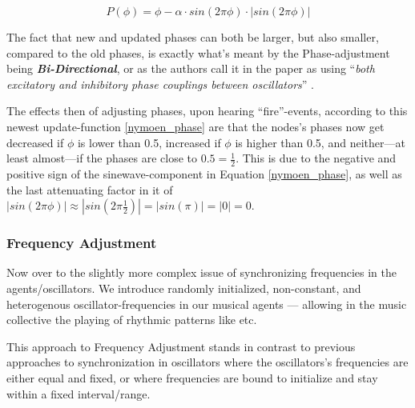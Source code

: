 			\begin{equation}
			\label{nymoen_phase}
				P(\phi) = \phi - \alpha \cdot sin(2\pi\phi) \cdot | sin(2\pi\phi) |
			\end{equation}
			
			The fact that new and updated phases can both be larger, but also smaller, compared to the old phases, is exactly what's meant by the Phase-adjustment being \textbf{\textit{Bi-Directional}}, or as the authors call it in the paper as using ``\textit{both excitatory and inhibitory phase couplings between oscillators}'' \cite{nymoen_synch}.
			
			The effects then of adjusting phases, upon hearing ``fire''-events, according to this newest update-function \eqref{nymoen_phase} are that the nodes's phases now get decreased if $\phi$ is lower than 0.5, increased if $\phi$ is higher than 0.5, and neither—at least almost—if the phases are close to $0.5 = \frac{1}{2}$. This is due to the negative and positive sign of the sinewave-component in Equation \eqref{nymoen_phase}, as well as the last attenuating factor in it of $| sin(2\pi\phi) | \approx | sin(2\pi \frac{1}{2}) | = | sin(\pi) | = | 0 | = 0.$
		
		
		\subsubsection{Frequency Adjustment}
		\label{subsubsec:freq_adj}
				
			Now over to the slightly more complex issue of synchronizing frequencies in the agents/oscillators. We introduce randomly initialized, non-constant, and heterogenous oscillator-frequencies in our musical agents — allowing in the music collective the playing of rhythmic patterns like  etc.
			
			This approach to Frequency Adjustment stands in contrast to previous approaches to synchronization in oscillators  where the oscillators's frequencies are either equal and fixed, or where frequencies are bound to initialize and stay within a fixed interval/range.
			
